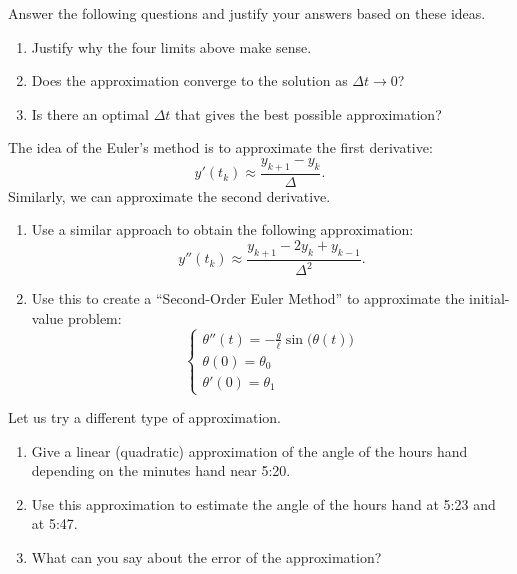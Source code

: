 \begin{exercises}
\begin{problist}
	Answer the following questions and justify your answers based on these ideas.
	\begin{enumerate}
		\item Justify why the four limits above make sense.
		\item Does the approximation converge to the solution as $\Delta t \to 0$?
		\item Is there an optimal $\Delta t$ that gives the best possible approximation?
	\end{enumerate}
	
	
	\prob The idea of the Euler's method is to approximate the first derivative:
	$$
	y'(t_k) \approx \frac{y_{k+1}-y_k}{\Delta}.
	$$
	Similarly, we can approximate the second derivative.
	\begin{enumerate}
		\item Use a similar approach to obtain the following approximation:
		$$
		y''(t_k) \approx \frac{y_{k+1} - 2 y_k + y_{k-1}}{\Delta^2}.
		$$
		\item Use this to create a ``Second-Order Euler Method'' to approximate the initial-value problem:
		$$
		\begin{cases}
			\theta''(t) = - \frac{g}{\ell} \sin\big(\theta(t)\big) \\
			\theta(0)=\theta_0 \\
			\theta'(0) = \theta_1
		\end{cases}
		$$

	\end{enumerate}

	\prob Let us try a different type of approximation. 
	\begin{enumerate}
		\item Give a linear (quadratic) approximation of the angle of the hours hand depending on the minutes hand near 5:20. 
		\item Use this approximation to estimate the angle of the hours hand at 5:23 and at 5:47.
		\item What can you say about the error of the approximation?
	\end{enumerate}
	
	
	\end{problist}
\end{exercises}